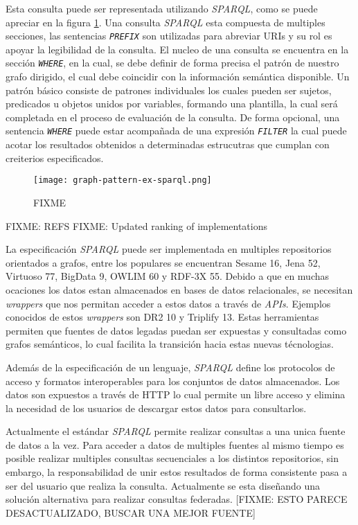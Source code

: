 Esta consulta puede ser representada utilizando \textit{SPARQL}, como se puede
apreciar en la figura \ref{fig:graph-pattern-ex-sparql}. Una consulta
\textit{SPARQL} esta compuesta de multiples secciones, las sentencias
\textit{\texttt{PREFIX}} son utilizadas para abreviar URIs y su rol es apoyar la
legibilidad de la consulta. El nucleo de una consulta se encuentra en la sección
\textit{\texttt{WHERE}}, en la cual, se debe definir de forma precisa el patrón
de nuestro grafo dirigido, el cual debe coincidir con la información semántica
disponible. Un patrón básico consiste de patrones individuales los cuales pueden
ser sujetos, predicados u objetos unidos por variables, formando una plantilla,
la cual será completada en el proceso de evaluación de la consulta. De forma
opcional, una sentencia \textit{\texttt{WHERE}} puede estar acompañada de una
expresión \textit{\texttt{FILTER}} la cual puede acotar los resultados obtenidos
a determinadas estrucutras que cumplan con creiterios especificados.

\begin{figure}
    \centering
    \texttt{[image: graph-pattern-ex-sparql.png]}
    \caption{FIXME}
    \label{fig:graph-pattern-ex-sparql}
\end{figure}

FIXME: REFS FIXME: Updated ranking of implementations

La especificación \textit{SPARQL} puede ser implementada en multiples
repositorios orientados a grafos, entre los populares se encuentran Sesame 16,
Jena 52, Virtuoso 77, BigData 9, OWLIM 60 y RDF-3X 55. Debido a que en muchas
ocaciones los datos estan almacenados en bases de datos relacionales, se
necesitan \textit{wrappers} que nos permitan acceder a estos datos a través de
\textit{APIs}. Ejemplos conocidos de estos \textit{wrappers} son DR2 10 y
Triplify 13. Estas herramientas permiten que fuentes de datos legadas puedan ser
expuestas y consultadas como grafos semánticos, lo cual facilita la transición
hacia estas nuevas técnologias.

Además de la especificación de un lenguaje, \textit{SPARQL} define los
protocolos de acceso y formatos interoperables para los conjuntos de datos
almacenados. Los datos son expuestos a través de HTTP lo cual permite un libre
acceso y elimina la necesidad de los usuarios de descargar estos datos para
consultarlos.

Actualmente el estándar \textit{SPARQL} permite realizar consultas a una unica
fuente de datos a la vez. Para acceder a datos de multiples fuentes al mismo
tiempo es posible realizar multiples consultas secuenciales a los distintos
repositorios, sin embargo, la responsabilidad de unir estos resultados de forma
consistente pasa a ser del usuario que realiza la consulta. Actualmente se esta
diseñando una solución alternativa para realizar consultas federadas. [FIXME:
ESTO PARECE DESACTUALIZADO, BUSCAR UNA MEJOR FUENTE]

